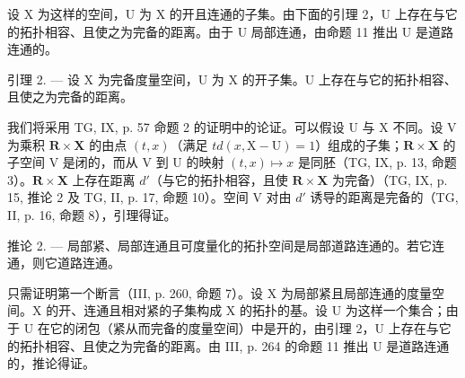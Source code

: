 设 X 为这样的空间，U 为 X 的开且连通的子集。由下面的引理 2，U 上存在与它的拓扑相容、且使之为完备的距离。由于 U 局部连通，由命题 11 推出 U 是道路连通的。

引理 2. --- 设 X 为完备度量空间，U 为 X 的开子集。U 上存在与它的拓扑相容、且使之为完备的距离。

我们将采用 TG, IX, p. 57 命题 2 的证明中的论证。可以假设 U 与 X 不同。设 V 为乘积 \(\mathbf{R} \times \mathbf{X}\) 的由点 \((t,x)\)（满足 \(td(x,\mathrm{X}-\mathrm{U})=1\)）组成的子集；\(\mathbf{R} \times \mathbf{X}\) 的子空间 V 是闭的，而从 V 到 U 的映射 \((t,x) \mapsto x\) 是同胚（TG, IX, p. 13, 命题 3）。\(\mathbf{R} \times \mathbf{X}\) 上存在距离 \(d'\)（与它的拓扑相容，且使 \(\mathbf{R} \times \mathbf{X}\) 为完备）（TG, IX, p. 15, 推论 2 及 TG, II, p. 17, 命题 10）。空间 V 对由 \(d'\) 诱导的距离是完备的（TG, II, p. 16, 命题 8），引理得证。

推论 2. --- 局部紧、局部连通且可度量化的拓扑空间是局部道路连通的。若它连通，则它道路连通。

只需证明第一个断言（III, p. 260, 命题 7）。设 X 为局部紧且局部连通的度量空间。X 的开、连通且相对紧的子集构成 X 的拓扑的基。设 U 为这样一个集合；由于 U 在它的闭包（紧从而完备的度量空间）中是开的，由引理 2，U 上存在与它的拓扑相容、且使之为完备的距离。由 III, p. 264 的命题 11 推出 U 是道路连通的，推论得证。

